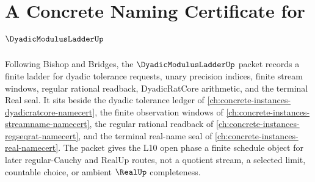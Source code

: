 \chapter{A Concrete Naming Certificate for $\DyadicModulusLadderUp$}
\label{ch:concrete-instances-dyadic-modulus-ladder-namecert}

Following Bishop and Bridges, the $\DyadicModulusLadderUp$ packet records a finite ladder for dyadic tolerance requests, unary precision indices, finite stream windows, regular rational readback, DyadicRatCore arithmetic, and the terminal Real seal. It sits beside the dyadic tolerance ledger of \autoref{ch:concrete-instances-dyadicratcore-namecert}, the finite observation windows of \autoref{ch:concrete-instances-streamname-namecert}, the regular rational readback of \autoref{ch:concrete-instances-regseqrat-namecert}, and the terminal real-name seal of \autoref{ch:concrete-instances-real-namecert}. The packet gives the L10 open phase a finite schedule object for later regular-Cauchy and RealUp routes, not a quotient stream, a selected limit, countable choice, or ambient $\RealUp$ completeness.

